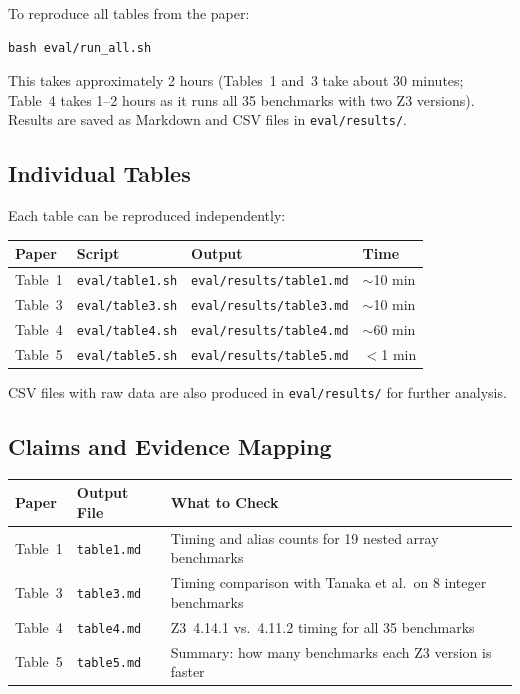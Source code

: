 \documentclass[a4paper,USenglish]{darts-v2021}
\begin{document}
To reproduce all tables from the paper:

\begin{verbatim}
bash eval/run_all.sh
\end{verbatim}

This takes approximately 2 hours (Tables~1 and~3 take about 30 minutes;
Table~4 takes 1--2 hours as it runs all 35 benchmarks with two Z3 versions).
Results are saved as Markdown and CSV files in \texttt{eval/results/}.

\subsection{Individual Tables}

Each table can be reproduced independently:

\begin{center}
\begin{tabular}{llll}
\hline
\textbf{Paper} & \textbf{Script} & \textbf{Output} & \textbf{Time} \\
\hline
Table~1 & \texttt{eval/table1.sh} & \texttt{eval/results/table1.md} & $\sim$10 min \\
Table~3 & \texttt{eval/table3.sh} & \texttt{eval/results/table3.md} & $\sim$10 min \\
Table~4 & \texttt{eval/table4.sh} & \texttt{eval/results/table4.md} & $\sim$60 min \\
Table~5 & \texttt{eval/table5.sh} & \texttt{eval/results/table5.md} & $<$1 min \\
\hline
\end{tabular}
\end{center}

CSV files with raw data are also produced in \texttt{eval/results/} for further analysis.

\subsection{Claims and Evidence Mapping}

\begin{center}
\begin{tabular}{lll}
\hline
\textbf{Paper} & \textbf{Output File} & \textbf{What to Check} \\
\hline
Table~1 & \texttt{table1.md} & Timing and alias counts for 19 nested array benchmarks \\
Table~3 & \texttt{table3.md} & Timing comparison with Tanaka et al.\ on 8 integer benchmarks \\
Table~4 & \texttt{table4.md} & Z3~4.14.1 vs.\ 4.11.2 timing for all 35 benchmarks \\
Table~5 & \texttt{table5.md} & Summary: how many benchmarks each Z3 version is faster \\
\hline
\end{tabular}
\end{center}
\end{document}
